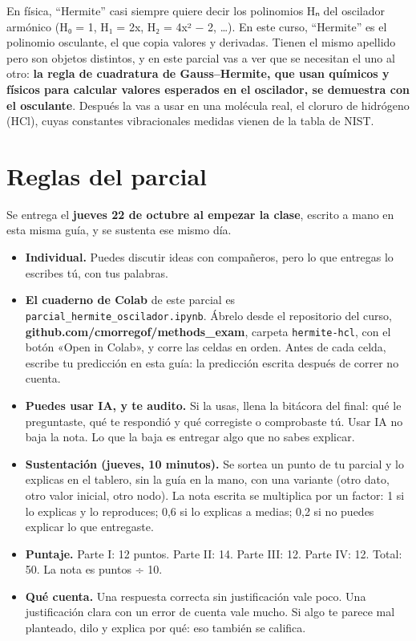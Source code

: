 
\newcommand{\docpie}{Parcial 1 · Los dos Hermite}

En física, ``Hermite'' casi siempre quiere decir los polinomios Hₙ del oscilador armónico (H₀ = 1, H₁ = 2x, H₂ = 4x² − 2, \ldots). En este curso, ``Hermite'' es el polinomio osculante, el que copia valores y derivadas. Tienen el mismo apellido pero son objetos distintos, y en este parcial vas a ver que se necesitan el uno al otro: \textbf{la regla de cuadratura de Gauss--Hermite, que usan químicos y físicos para calcular valores esperados en el oscilador, se demuestra con el osculante}. Después la vas a usar en una molécula real, el cloruro de hidrógeno (HCl), cuyas constantes vibracionales medidas vienen de la tabla de NIST.

\section{Reglas del parcial}

Se entrega el \textbf{jueves 22 de octubre al empezar la clase}, escrito a mano en esta misma guía, y se sustenta ese mismo día.

\begin{itemize}
\tightlist
\item
  \textbf{Individual.} Puedes discutir ideas con compañeros, pero lo que entregas lo escribes tú, con tus palabras.
\item
  \textbf{El cuaderno de Colab} de este parcial es \texttt{parcial\_hermite\_oscilador.ipynb}. Ábrelo desde el repositorio del curso, \textbf{github.com/cmorregof/methods\_exam}, carpeta \texttt{hermite-hcl}, con el botón «Open in Colab», y corre las celdas en orden. Antes de cada celda, escribe tu predicción en esta guía: la predicción escrita después de correr no cuenta.
\item
  \textbf{Puedes usar IA, y te audito.} Si la usas, llena la bitácora del final: qué le preguntaste, qué te respondió y qué corregiste o comprobaste tú. Usar IA no baja la nota. Lo que la baja es entregar algo que no sabes explicar.
\item
  \textbf{Sustentación (jueves, 10 minutos).} Se sortea un punto de tu parcial y lo explicas en el tablero, sin la guía en la mano, con una variante (otro dato, otro valor inicial, otro nodo). La nota escrita se multiplica por un factor: 1 si lo explicas y lo reproduces; 0,6 si lo explicas a medias; 0,2 si no puedes explicar lo que entregaste.
\item
  \textbf{Puntaje.} Parte I: 12 puntos. Parte II: 14. Parte III: 12. Parte IV: 12. Total: 50. La nota es puntos ÷ 10.
\item
  \textbf{Qué cuenta.} Una respuesta correcta sin justificación vale poco. Una justificación clara con un error de cuenta vale mucho. Si algo te parece mal planteado, dilo y explica por qué: eso también se califica.
\end{itemize}

